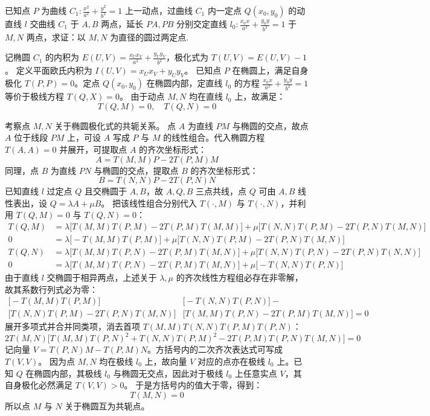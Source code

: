 \begin{exercise}
已知点 \(P\) 为曲线 \(C_1: \frac{x^2}{a^2}+\frac{y^2}{b^2}=1\) 上一动点，过曲线 \(C_1\) 内一定点 \(Q(x_0, y_0)\) 的动直线 \(l\) 交曲线 \(C_1\) 于 \(A, B\) 两点，延长 \(PA, PB\) 分别交定直线 \(l_0: \frac{x_0x}{a^2} + \frac{y_0y}{b^2} = 1\) 于 \(M, N\) 两点，求证：以 \(M, N\) 为直径的圆过两定点.
\end{exercise}
\begin{solution}
记椭圆 $C_1$ 的内积为 $E(U,V) = \frac{x_U x_V}{a^2} + \frac{y_U y_V}{b^2}$，极化式为 $T(U,V) = E(U,V) - 1$。
定义平面欧氏内积为 $I(U,V) = x_U x_V + y_U y_V$。
已知点 $P$ 在椭圆上，满足自身极化 $T(P,P) = 0$。定点 $Q(x_0, y_0)$ 在椭圆内部，定直线 $l_0$ 的方程 $\frac{x_0 x}{a^2} + \frac{y_0 y}{b^2} = 1$ 等价于极线方程 $T(Q,X) = 0$。
由于动点 $M, N$ 均在直线 $l_0$ 上，故满足：
$$ T(Q,M) = 0, \quad T(Q,N) = 0 $$

考察点 $M, N$ 关于椭圆极化式的共轭关系。
点 $A$ 为直线 $PM$ 与椭圆的交点，故点 $A$ 位于线段 $PM$ 上，可设 $A$ 写成 $P$ 与 $M$ 的线性组合。代入椭圆方程 $T(A,A) = 0$ 并展开，可提取点 $A$ 的齐次坐标形式：
$$ A = T(M,M)P - 2T(P,M)M $$
同理，点 $B$ 为直线 $PN$ 与椭圆的交点，提取点 $B$ 的齐次坐标形式：
$$ B = T(N,N)P - 2T(P,N)N $$
已知直线 $l$ 过定点 $Q$ 且交椭圆于 $A, B$，故 $A, Q, B$ 三点共线，点 $Q$ 可由 $A, B$ 线性表出，设 $Q = \lambda A + \mu B$。
把该线性组合分别代入 $T(\cdot, M)$ 与 $T(\cdot, N)$，并利用 $T(Q,M) = 0$ 与 $T(Q,N) = 0$：
\begin{align*}
T(Q,M) &= \lambda \big[T(M,M)T(P,M) - 2T(P,M)T(M,M)\big] + \mu \big[T(N,N)T(P,M) - 2T(P,N)T(M,N)\big] \\
0 &= \lambda \big[-T(M,M)T(P,M)\big] + \mu \big[T(N,N)T(P,M) - 2T(P,N)T(M,N)\big] \\
T(Q,N) &= \lambda \big[T(M,M)T(P,N) - 2T(P,M)T(M,N)\big] + \mu \big[T(N,N)T(P,N) - 2T(P,N)T(N,N)\big] \\
0 &= \lambda \big[T(M,M)T(P,N) - 2T(P,M)T(M,N)\big] + \mu \big[-T(N,N)T(P,N)\big]
\end{align*}
由于直线 $l$ 交椭圆于相异两点，上述关于 $\lambda, \mu$ 的齐次线性方程组必存在非零解，故其系数行列式必为零：
\begin{align*}
 \big[-T(M,M)T(P,M)\big]& \big[-T(N,N)T(P,N)\big]- \\
\big[T(N,N)T(P,M) - 2T(P,N)T(M,N)\big]& \big[T(M,M)T(P,N) - 2T(P,M)T(M,N)\big] = 0
\end{align*}
展开多项式并合并同类项，消去首项 $T(M,M)T(N,N)T(P,M)T(P,N)$：
$$ 2T(M,N) \big[ T(M,M)T(P,N)^2 + T(N,N)T(P,M)^2 - 2T(P,M)T(P,N)T(M,N) \big] = 0 $$
记向量 $V = T(P,N)M - T(P,M)N$。方括号内的二次齐次表达式可写成 $T(V,V)$。
因为点 $M, N$ 均在极线 $l_0$ 上，故向量 $V$ 对应的点亦在极线 $l_0$ 上。已知 $Q$ 在椭圆内部，其极线 $l_0$ 与椭圆无交点，因此对于极线 $l_0$ 上任意实点 $V$，其自身极化必然满足 $T(V,V) > 0$。
于是方括号内的值大于零，得到：
$$ T(M,N) = 0 $$
所以点 $M$ 与 $N$ 关于椭圆互为共轭点。


\end{solution}
